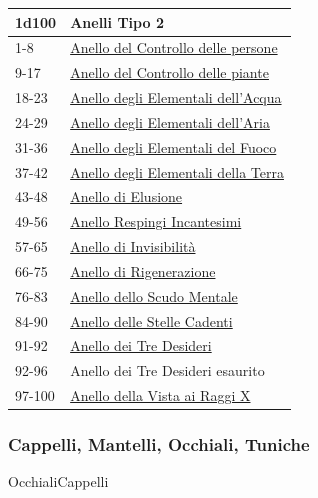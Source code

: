 \begin{multicols}{2}
{{\small\begin{tabular}{ll}
		\toprule
\textbf{1d100} & \textbf{Anelli Tipo 2}\\
\toprule
1-8 & \hyperlink{AnellodelControllodellepersone}{Anello del Controllo delle persone}\\
9-17 & \hyperlink{AnellodelControllodellepiante}{Anello del Controllo delle piante}\\
18-23 & \hyperlink{AnellodegliElementalidell'Acqua}{Anello degli Elementali dell'Acqua}\\
24-29 & \hyperlink{AnellodegliElementalidell'Aria}{Anello degli Elementali dell'Aria}\\
31-36 & \hyperlink{AnellodegliElementalidelFuoco}{Anello degli Elementali del Fuoco}\\
37-42 & \hyperlink{AnellodegliElementalidellaTerra}{Anello degli Elementali della Terra}\\
43-48 & \hyperlink{Anello di Elusione}{Anello di Elusione}\\
49-56 & \hyperlink{AnelloRespingiIncantesimi}{Anello Respingi Incantesimi}\\
57-65 & \hyperlink{AnellodiInvisibilità}{Anello di Invisibilità}\\
66-75 & \hyperlink{AnellodiRigenerazione}{Anello di Rigenerazione}\\
76-83 & \hyperlink{AnellodelloScudoMentale}{Anello dello Scudo Mentale}\\
84-90 & \hyperlink{AnellodelleStelleCadenti}{Anello delle Stelle Cadenti}\\
91-92 & \hyperlink{AnellodeiTreDesideri}{Anello dei Tre Desideri}\\
92-96 & Anello dei Tre Desideri esaurito\\
97-100 & \hyperlink{AnellodellaVistaaiRaggiX}{Anello della Vista ai Raggi X}

\end{tabular}}

\subsubsection{Cappelli, Mantelli, Occhiali, Tuniche}\label{cappellimantelli}\hypertarget{Mantelli}{}\hypertarget{Tuniche}{}\hypertarget{Occhiali}{Occhiali}\hypertarget{Cappelli}{Cappelli}

}
\end{multicols}
